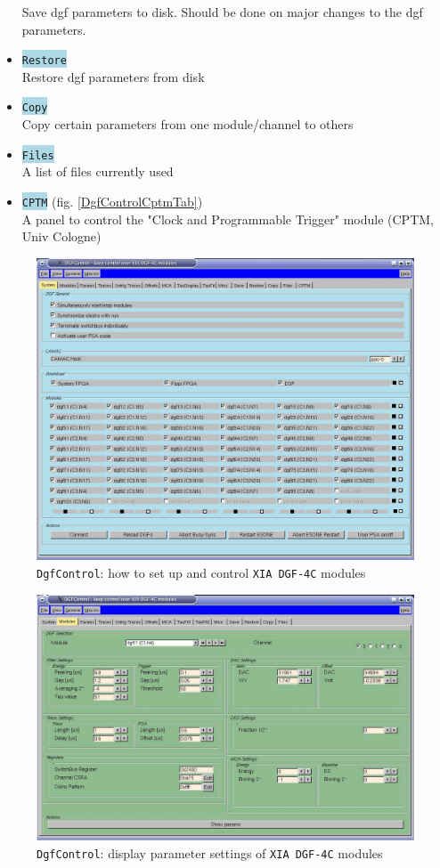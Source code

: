 \documentclass[10pt]{article}
\newcommand{\blue}[1]{\colorbox{lightblue}{\texttt{#1}}}
\begin{document}
\begin{center}
\begin{itemize}
	Save dgf parameters to disk. Should be done on major changes to the dgf parameters.
\item	\blue{Restore}\\
	Restore dgf parameters from disk
\item	\blue{Copy}\\
	Copy certain parameters from one module/channel to others
\item	\blue{Files}\\
	A list of files currently used
\item	\blue{CPTM} (fig. \ref{DgfControlCptmTab})\\
	A panel to control the "Clock and Programmable Trigger" module (CPTM, Univ Cologne)
\end{itemize}
\end{center}
\begin{figure}[H]
\centerline{\includegraphics[width=1.2\linewidth]{DgfControlSystemTab}}
\caption{\texttt{DgfControl}: how to set up and control \texttt{XIA DGF-4C} modules}
\label{DgfControlSystemTab}
\end{figure}
\newpage
\begin{figure}[H]
\centerline{\includegraphics[width=1.2\linewidth]{DgfControlModulesTab}}
\caption{\texttt{DgfControl}: display parameter settings of \texttt{XIA DGF-4C} modules}
\label{DgfControlModulesTab}
\end{figure}
\end{document}
